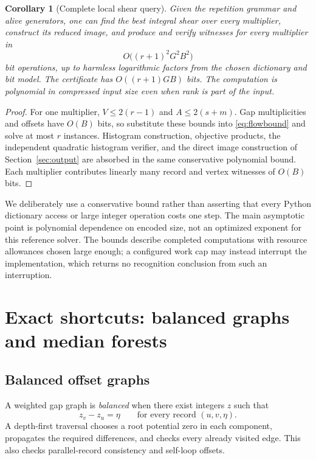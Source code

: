 \documentclass[11pt,letterpaper]{article}
\newtheorem{corollary}[theorem]{Corollary}
\theoremstyle{definition}
\theoremstyle{remark}\newtheorem{remark}[theorem]{Remark}
\begin{document}
\begin{corollary}[Complete local shear query]
Given the repetition grammar and alive generators, one can find the best
integral shear over every multiplier, construct its reduced image, and produce
and verify witnesses for every multiplier in
\begin{equation}
 O\bigl((r+1)^2G^2B^2\bigr)
 \label{eq:globalbound}
\end{equation}
bit operations, up to harmless logarithmic factors from the chosen dictionary
and bit model. The certificate has $O((r+1)GB)$ bits. The computation is
polynomial in compressed input size even when rank is part of the input.
\end{corollary}
\begin{proof}
For one multiplier, $V\le2(r-1)$ and $A\le2(s+m)$. Gap multiplicities and
offsets have $O(B)$ bits, so substitute these bounds into
\eqref{eq:flowbound} and solve at most $r$ instances. Histogram construction,
objective products, the independent quadratic histogram verifier, and the
direct image construction of Section~\ref{sec:output} are absorbed in the
same conservative polynomial bound. Each multiplier contributes linearly
many record and vertex witnesses of $O(B)$ bits.
\end{proof}

We deliberately use a conservative bound rather than asserting that every
Python dictionary access or large integer operation costs one step. The
main asymptotic point is polynomial dependence on encoded size, not an
optimized exponent for this reference solver.
The bounds describe completed computations with resource allowances chosen
large enough; a configured work cap may instead interrupt the implementation,
which returns no recognition conclusion from such an interruption.

\section{Exact shortcuts: balanced graphs and median forests}
\label{sec:shortcuts}

\subsection{Balanced offset graphs}

A weighted gap graph is \emph{balanced} when there exist integers $z$ such that
\[
 z_v-z_u=\eta \qquad\text{for every record }(u,v,\eta).
\]
A depth-first traversal chooses a root potential zero in each component,
propagates the required differences, and checks every already visited edge.
This also checks parallel-record consistency and self-loop offsets.
\end{document}
